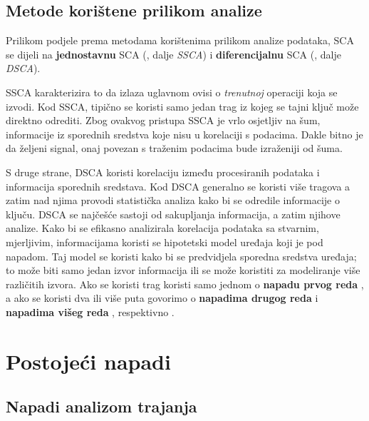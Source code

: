 \documentclass[times, utf8, diplomski]{fer}
\begin{document}
\subsection{Metode korištene prilikom analize}

Prilikom podjele prema metodama korištenima prilikom analize podataka, SCA se dijeli na \textbf{jednostavnu} SCA (, dalje \emph{SSCA}) i \textbf{diferencijalnu} SCA (, dalje \emph{DSCA}).

SSCA karakterizira to da izlaza uglavnom ovisi o \emph{trenutnoj} operaciji koja se izvodi. Kod SSCA, tipično se koristi samo jedan trag  iz kojeg se tajni ključ može direktno odrediti. Zbog ovakvog pristupa SSCA je vrlo osjetljiv na šum, informacije iz sporednih sredstva koje nisu u korelaciji s podacima. Dakle bitno je da željeni signal, onaj povezan s traženim podacima bude izraženiji od šuma.

S druge strane, DSCA koristi korelaciju između procesiranih podataka i informacija sporednih sredstava. Kod DSCA generalno se koristi više tragova a zatim nad njima provodi statistička analiza kako bi se odredile informacije o ključu. DSCA se najčešće sastoji od sakupljanja informacija, a zatim njihove analize. Kako bi se efikasno analizirala korelacija podataka sa stvarnim, mjerljivim, informacijama koristi se hipotetski model uređaja koji je pod napadom. Taj model se koristi kako bi se predvidjela sporedna sredstva uređaja; to može biti samo jedan izvor informacija ili se može koristiti za modeliranje više različitih izvora. Ako se koristi trag koristi samo jednom o \textbf{napadu prvog reda} , a ako se koristi dva ili više puta govorimo o \textbf{napadima drugog reda}  i \textbf{napadima višeg reda} , respektivno \citep{zhou2005side}.

\section{Postojeći napadi} \label{sec:known_attacks}

\subsection{Napadi analizom trajanja}
\end{document}
